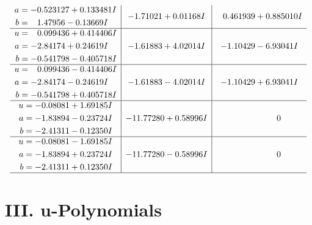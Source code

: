 \documentclass[1p]{elsarticle_modified}
\theoremstyle{definition}
\begin{document}
$$\begin{array}{c|c|c}
\begin{aligned}
a &= -0.523127 + 0.133481 I \\
b &= \phantom{-}1.47956 - 0.13669 I\end{aligned}
 & -1.71021 + 0.01168 I & \phantom{-}0.461939 + 0.885010 I \\ \hline\begin{aligned}
u &= \phantom{-}0.099436 + 0.414406 I \\
a &= -2.84174 + 0.24619 I \\
b &= -0.541798 - 0.405718 I\end{aligned}
 & -1.61883 + 4.02014 I & -1.10429 - 6.93041 I \\ \hline\begin{aligned}
u &= \phantom{-}0.099436 - 0.414406 I \\
a &= -2.84174 - 0.24619 I \\
b &= -0.541798 + 0.405718 I\end{aligned}
 & -1.61883 - 4.02014 I & -1.10429 + 6.93041 I \\ \hline\begin{aligned}
u &= -0.08081 + 1.69185 I \\
a &= -1.83894 - 0.23724 I \\
b &= -2.41311 - 0.12350 I\end{aligned}
 & -11.77280 + 0.58996 I & \phantom{-0.000000 } 0 \\ \hline\begin{aligned}
u &= -0.08081 - 1.69185 I \\
a &= -1.83894 + 0.23724 I \\
b &= -2.41311 + 0.12350 I\end{aligned}
 & -11.77280 - 0.58996 I & \phantom{-0.000000 } 0\\
 \hline 
 \end{array}$$\newpage
\newpage\renewcommand{\arraystretch}{1}
\centering \section*{ III. u-Polynomials}
\end{document}
